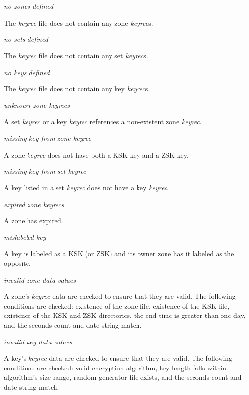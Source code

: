 \begin{description}

\item {\it no zones defined}\verb" "

The {\it keyrec} file does not contain any zone {\it keyrec}s.

\item {\it no sets defined}\verb" "

The {\it keyrec} file does not contain any set {\it keyrec}s.

\item {\it no keys defined}\verb" "

The {\it keyrec} file does not contain any key {\it keyrec}s.

\item {\it unknown zone {\it keyrec}s}\verb" "

A set {\it keyrec} or a key {\it keyrec} references a non-existent zone
{\it keyrec}.

\item {\it missing key from zone {\it keyrec}}\verb" "

A zone {\it keyrec} does not have both a KSK key and a ZSK key.

\item {\it missing key from set {\it keyrec}}\verb" "

A key listed in a set {\it keyrec} does not have a key {\it keyrec}.

\item {\it expired zone {\it keyrec}s}\verb" "

A zone has expired.

\item {\it mislabeled key}\verb" "

A key is labeled as a KSK (or ZSK) and its owner zone has it labeled as the
opposite.

\item {\it invalid zone data values}\verb" "

A zone's {\it keyrec} data are checked to ensure that they are valid.  The
following conditions are checked:  existence of the zone file, existence of
the KSK file, existence of the KSK and ZSK directories, the end-time is
greater than one day, and the seconds-count and date string match.

\item {\it invalid key data values}\verb" "

A key's {\it keyrec} data are checked to ensure that they are valid.  The
following conditions are checked:  valid encryption algorithm, key length
falls within algorithm's size range, random generator file exists, and the
seconds-count and date string match.

\end{description}

